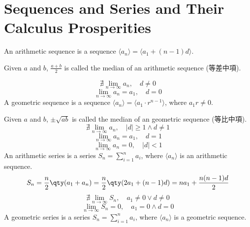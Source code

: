 \documentclass[a4paper,12pt]{report}
\begin{document}
\section{Sequences and Series and Their Calculus Prosperities}
An arithmetic sequence is a sequence $\langle a_n\rangle=\langle a_1+(n-1)d\rangle$. 

Given $a$ and $b$, $\frac{a+b}{2}$ is called the median of an arithmetic sequence (等差中項).

\[\nexists\lim_{n\to\infty}a_n,\quad d\neq 0\]
\[\lim_{n\to\infty}a_n=a_1,\quad d=0\]
A geometric sequence is a sequence $\langle a_n\rangle=\langle a_1\cdot r^{n-1}\rangle$, where $a_1r\neq 0$.

Given $a$ and $b$, $\pm\sqrt{ab}$ is called the median of an geometric sequence (等比中項).
\[\nexists\lim_{n\to\infty}a_n,\quad |d|\geq 1\land d\neq 1\]
\[\lim_{n\to\infty}a_n=a_1,\quad d=1\]
\[\lim_{n\to\infty}a_n=0,\quad |d|<1\]
An arithmetic series is a series $S_n=\sum_{i=1}^na_i$, where $\langle a_n\rangle$ is an arithmetic sequence.
\[S_n=\frac{n}{2}\qty(a_1+a_n)=\frac{n}{2}\qty(2a_1+(n-1)d)=na_1+\frac{n(n-1)d}{2}\]
\[\nexists\lim_{n\to\infty}S_n,\quad a_1\neq 0\lor d\neq 0\]
\[\lim_{n\to\infty}S_n=0,\quad a_1=0\land d=0\]
A geometric series is a series $S_n=\sum_{i=1}^na_i$, where $\langle a_n\rangle$ is a geometric sequence.
\end{document}
